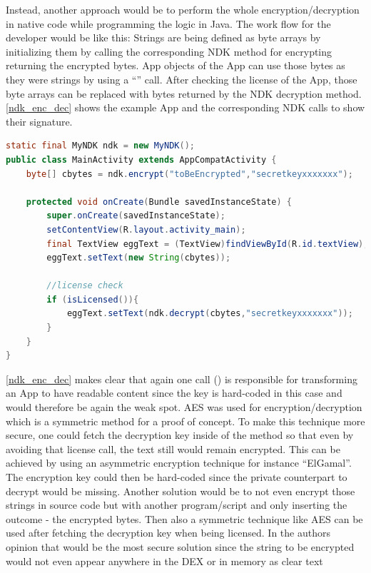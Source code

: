 Instead, another approach would be to perform the whole encryption/decryption
in native code while programming the logic in Java. The work flow for the developer would be like this: Strings are being defined as byte arrays by initializing them by calling the corresponding NDK method for encrypting
returning the encrypted bytes. App objects of the App can use those bytes
as they were strings by using a ``'' call.
After checking the license of the App, those byte arrays can be replaced
with bytes returned by the NDK decryption method. \autoref{ndk_enc_dec}
shows the example App and the corresponding NDK calls to show their signature.
\begin{lstlisting}[language=Java, caption=NDK Encryption/Decryption, label=ndk_enc_dec]
static final MyNDK ndk = new MyNDK();
public class MainActivity extends AppCompatActivity {
    byte[] cbytes = ndk.encrypt("toBeEncrypted","secretkeyxxxxxxx");

    protected void onCreate(Bundle savedInstanceState) {
        super.onCreate(savedInstanceState);
        setContentView(R.layout.activity_main);
        final TextView eggText = (TextView)findViewById(R.id.textView);
        eggText.setText(new String(cbytes));

        //license check
        if (isLicensed()){
            eggText.setText(ndk.decrypt(cbytes,"secretkeyxxxxxxx"));
        }
    }
}
\end{lstlisting}
\autoref{ndk_enc_dec} makes clear that again one call () is
responsible for transforming an App to have readable content since the key
is hard-coded in this case and would therefore be again the weak spot. AES
was used for encryption/decryption which is a symmetric method for a proof of concept. To make this technique more secure, one could fetch the decryption
key inside of the  method so that even by avoiding that
license call, the text still would remain encrypted. This can be achieved
by using an asymmetric encryption technique for instance ``ElGamal''.
The encryption key could then be hard-coded since the private counterpart
to decrypt would be missing. Another solution would be to not even encrypt
those strings in source code but with another program/script and only inserting the outcome - the encrypted bytes.
Then also a symmetric technique like AES can be used
after fetching the decryption key when being licensed. In the authors opinion
that would be the most secure solution since the string to be encrypted
would not even appear anywhere in the DEX or in memory as clear text
